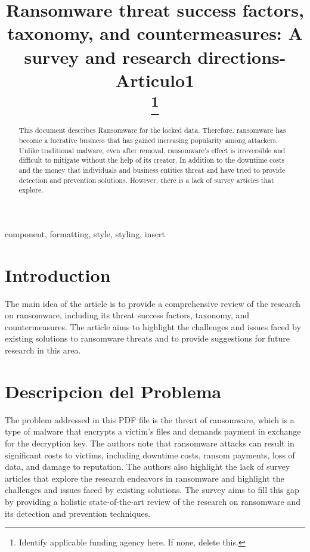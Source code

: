 \documentclass[conference]{IEEEtran}
\begin{document}
\title{Ransomware threat success factors, taxonomy, and countermeasures: A survey and research directions-Articulo1\\

\thanks{Identify applicable funding agency here. If none, delete this.}
}

\author{

}

\maketitle

\begin{abstract}

This document describes Ransomware 
for the locked data. Therefore, ransomware has become a lucrative business that has gained
increasing popularity among attackers. Unlike traditional malware, even after removal,
ransomware’s effect is irreversible and difficult to mitigate without the help of its creator.
In addition to the downtime costs and the money that individuals and business entities
threat and have tried to provide detection and prevention solutions. However, there is a lack
of survey articles that explore.

\end{abstract}

\begin{IEEEkeywords}
component, formatting, style, styling, insert
\end{IEEEkeywords}

\section{\textbf{Introduction}}

The main idea of the article is to provide a comprehensive review of the research on ransomware, including its threat success factors, taxonomy, and countermeasures. The article aims to highlight the challenges and issues faced by existing solutions to ransomware threats and to provide suggestions for future research in this area.



\section{\textbf{Descripcion del Problema}}

The problem addressed in this PDF file is the threat of ransomware, which is a type of malware that encrypts a victim's files and demands payment in exchange for the decryption key. The authors note that ransomware attacks can result in significant costs to victims, including downtime costs, ransom payments, loss of data, and damage to reputation. The authors also highlight the lack of survey articles that explore the research endeavors in ransomware and highlight the challenges and issues faced by existing solutions. The survey aims to fill this gap by providing a holistic state-of-the-art review of the research on ransomware and its detection and prevention techniques.
\end{document}
